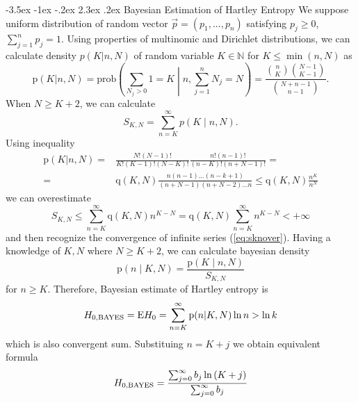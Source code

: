 \documentclass[a4paper,10pt]{article}
\makeatletter
\renewcommand\section{\@startsection {section}{1}{\z@}%
                                   {-3.5ex \@plus -1ex \@minus -.2ex}%
                                   {2.3ex \@plus.2ex}%
                                   {\large\bfseries}}
\makeatother
\begin{document}
\section {Bayesian Estimation of Hartley Entropy}
We suppose uniform distribution of random vector $\vec{p} = (p_{1},...,p_{n})$ satisfying  $p_{j} \ge 0$, $\sum_{j=1}^{n} p_{j} = 1$. Using properties of multinomic and Dirichlet distributions, we can calculate density $p(K|n,N)$ of random variable $K \in \mathbb{N}$ for $K \le \min(n,N)$ as 
\begin{equation} 
\label{eq:pknn}
\text{p}(K|n,N) = \text{prob}\left(\sum_{N_{j} > 0}{1}=K \middle| n,\sum_{j=1}^{n}{N_{j}}=N\right) = \frac{{n \choose K}{N-1 \choose K-1}}{{N+n-1 \choose n-1}}.
\end{equation}
When $N \ge K+2$, we can calculate 
\begin{equation} 
\label{eq:skn}
S_{K,N} = \sum_{n=K}^{\infty}{p\left(K \middle| n,N\right)}.
\end{equation}
Using inequality
\begin{equation} 
\label{eq:pknnplus}
\begin{split}
\text{p}(K|n,N) = & \frac{N!(N-1)!}{K!(K-1)!(N-K)!} \frac{n!(n-1)!}{(n-K)!(n+N-1)!} = \\ = & \text{q}(K,N) \frac{n(n-1)...(n-k+1)}{(n+N-1)(n+N-2)...n} \le \text{q}(K,N)\frac{n^K}{n^N}
\end{split}
\end{equation}
we can overestimate
\begin{equation} 
\label{eq:sknover}
S_{K,N} \le \sum_{n=K}^{\infty}{\text{q}(K,N)n^{K-N}} = \text{q}(K,N)\sum_{n=K}^{\infty}{n^{K-N}} < +\infty
\end{equation}
and then recognize the convergence of infinite series (\ref{eq:sknover}). Having a knowledge of $K,N$ where $N \ge K+2$, we can calculate bayesian density
\begin{equation} 
\label{eq:pnkn}
\text{p}\left(n \middle| K,N \right) = \frac{\text{p}\left(K \middle| n,N\right)}{S_{K,N}}
\end{equation}
for $n \ge K$.
Therefore, Bayesian estimate of Hartley entropy is
\begin{equation} 
\label{eq:hnbayes}
H_{0,\mbox{\scriptsize{BAYES}}} = \text{E}H_{0} = \sum_{n=K}^{\infty}{\text{p}(n|K,N)\ln{n}} > \ln{k}
\end{equation}
which is also convergent sum. Substituing $n=K+j$ we obtain equivalent formula
\begin{equation} 
\label{eq:hnbayes}
H_{0,\mbox{\scriptsize{BAYES}}} = \frac{\sum_{j=0}^{\infty}{b_{j}\ln{(K+j)}}}{\sum_{j=0}^{\infty}{b_j}}
\end{equation}
\end{document}
